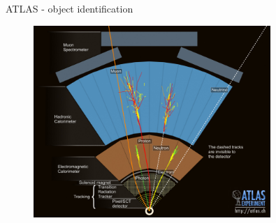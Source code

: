 \begin{frame}{ATLAS - object identification}
    \begin{figure}
        \centering
        \includegraphics[width=0.8\textwidth]{figures_theory/atlas_quer.jpg}
        \caption{\cite{Pequenao:1095924}}
        \label{fig:my_label}
    \end{figure}
\end{frame}



